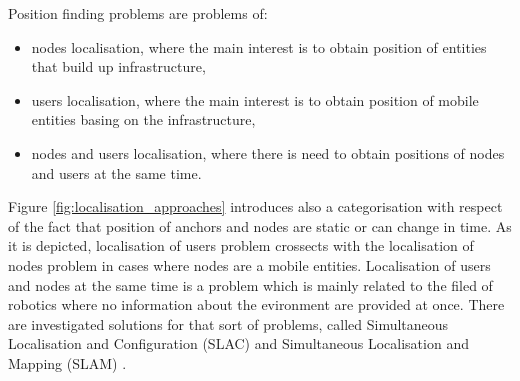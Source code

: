 \documentclass[../main.tex]{subfiles}
\begin{document}
Position finding problems are problems of:
\begin{itemize}
 	\item nodes localisation, where the main interest is to obtain position of entities that build up infrastructure,
 	\item users localisation, where the main interest is to obtain position of mobile entities basing on the infrastructure,
 	\item nodes and users localisation, where there is need to obtain positions of nodes and users at the same time.
 \end{itemize}
Figure \ref{fig:localisation_approaches} introduces also a categorisation with respect of the fact that position of anchors and nodes are static or can change in time. As it is depicted, localisation of users problem crossects with the localisation of nodes problem in cases where nodes are a mobile entities. Localisation of users and nodes at the same time is a problem which is mainly related to the filed of robotics where no information about the evironment are provided at once. There are investigated solutions for that sort of problems, called Simultaneous Localisation and Configuration (SLAC) and Simultaneous Localisation and Mapping (SLAM) \cite{discover_beacons_and_position}.
\end{document}
